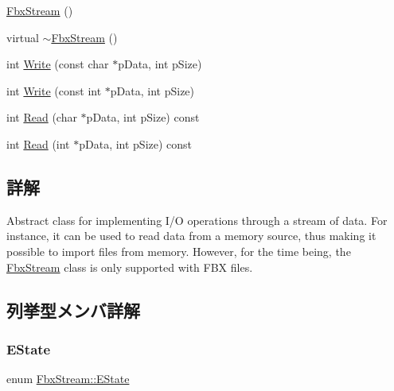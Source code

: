 \begin{DoxyCompactItemize}
\item 
\hyperlink{class_fbx_stream_ae1db7fc4d50c55cd8715ffd3ab2903b4}{Fbx\+Stream} ()
\item 
virtual \hyperlink{class_fbx_stream_a41562dba7c7948515f7c4997d6adbea5}{$\sim$\+Fbx\+Stream} ()
\item 
int \hyperlink{class_fbx_stream_a1506d750babeb4c981dc7aa4ce94d505}{Write} (const char $\ast$p\+Data, int p\+Size)
\item 
int \hyperlink{class_fbx_stream_aef3f0bcab29775b9deffb0142a399891}{Write} (const int $\ast$p\+Data, int p\+Size)
\item 
int \hyperlink{class_fbx_stream_ad54e82f43c2b8b441c427a77d2663a7e}{Read} (char $\ast$p\+Data, int p\+Size) const
\item 
int \hyperlink{class_fbx_stream_afeadb32985899a9d3eb21aead9bbb546}{Read} (int $\ast$p\+Data, int p\+Size) const
\end{DoxyCompactItemize}


\subsection{詳解}
Abstract class for implementing I/O operations through a stream of data. For instance, it can be used to read data from a memory source, thus making it possible to import files from memory. However, for the time being, the \hyperlink{class_fbx_stream}{Fbx\+Stream} class is only supported with F\+BX files. 

\subsection{列挙型メンバ詳解}
\mbox{\label{class_fbx_stream_adc469d38eb30339fa4190eb6c66ec8f7}} 
\subsubsection{\texorpdfstring{E\+State}{EState}}
{\footnotesize\ttfamily enum \hyperlink{class_fbx_stream_adc469d38eb30339fa4190eb6c66ec8f7}{Fbx\+Stream\+::\+E\+State}}

